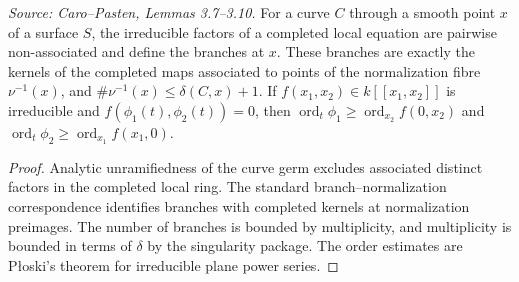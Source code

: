 \begin{lemma}
  \label{lem:cp_branches_package}
  \textit{Source: Caro--Pasten, Lemmas 3.7--3.10.}
  For a curve \(C\) through a smooth point \(x\) of a surface \(S\), the
  irreducible factors of a completed local equation are pairwise
  non-associated and define the branches at \(x\).  These branches are exactly
  the kernels of the completed maps associated to points of the normalization
  fibre \(\nu^{-1}(x)\), and
  \(\#\nu^{-1}(x)\le\delta(C,x)+1\).  If
  \(f(x_1,x_2)\in k[[x_1,x_2]]\) is irreducible and
  \(f(\phi_1(t),\phi_2(t))=0\), then
  \(\operatorname{ord}_t\phi_1\ge\operatorname{ord}_{x_2}f(0,x_2)\) and
  \(\operatorname{ord}_t\phi_2\ge\operatorname{ord}_{x_1}f(x_1,0)\).
\end{lemma}
\begin{proof}
  Analytic unramifiedness of the curve germ excludes associated distinct
  factors in the completed local ring.  The standard branch--normalization
  correspondence identifies branches with completed kernels at normalization
  preimages.  The number of branches is bounded by multiplicity, and
  multiplicity is bounded in terms of \(\delta\) by the singularity package.
  The order estimates are Płoski's theorem for irreducible plane power series.
\end{proof}

